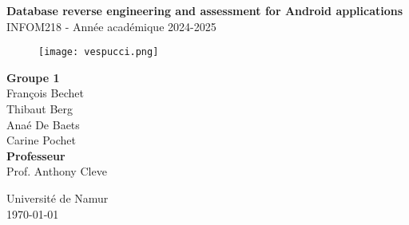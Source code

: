 \documentclass[a4paper,11pt]{article}
\begin{document}
\begin{titlepage}
    \begin{center}
        \vspace*{3cm}
        \Huge\textbf{Database reverse engineering and assessment for
            Android applications}\\
        \vspace{1cm}
        \Large INFOM218 - Année académique 2024-2025\\
        \vspace{0cm}
        \begin{figure}[h!]
            \centering
            \texttt{[image: vespucci.png]}
            \label{fig:logo-vespucci}
        \end{figure}
        \vspace{0cm}
        {\Large\textbf{Groupe 1}}\\
        \vspace{0.5cm}
        {\Large François Bechet\\
            Thibaut Berg}\\
        Anaé De Baets\\
        Carine Pochet\\
        \vspace{1cm}
        {\Large\textbf{Professeur}}\\
        \vspace{0.5cm}
        {\Large Prof. Anthony Cleve}\\
        \vfill
        \begin{figure}[h!]
            \centering
            
            \label{fig:logo-unamur}
        \end{figure}
        \Large Université de Namur\\
        \Large \today
    \end{center}
\end{titlepage}

\tableofcontents
\newpage


\newpage

\newpage

\newpage

\newpage
\end{document}
